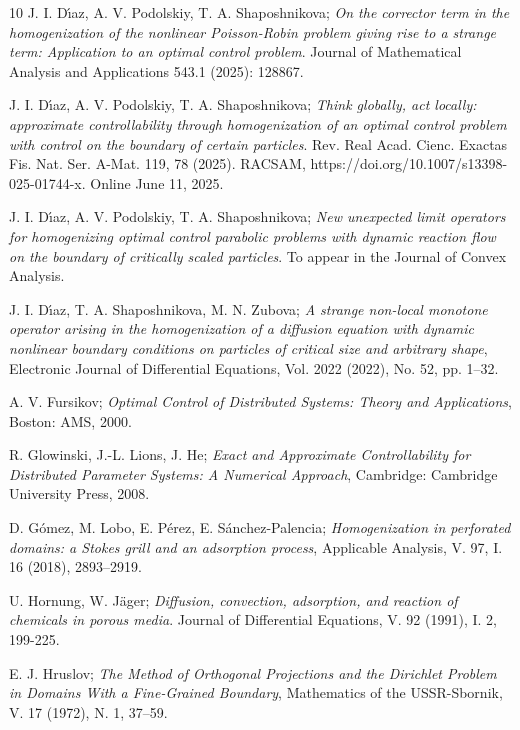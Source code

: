 \documentclass[reqno]{amsart}
\begin{document}
\begin{thebibliography}{10}
J. I. D\'{\i}az, A. V. Podolskiy, T. A. Shaposhnikova;
\emph{On the corrector term in the
homogenization of the nonlinear Poisson-Robin problem giving rise to a
strange term: Application to an optimal control problem}. 
Journal of Mathematical Analysis and Applications 543.1 (2025): 128867.

 J. I. D\'{\i}az, A. V. Podolskiy, T. A. Shaposhnikova;
\emph{Think globally, act locally: approximate controllability
through homogenization of an optimal control problem with control on the
boundary of certain particles}. Rev. Real Acad. Cienc. Exactas Fis. Nat. Ser.
A-Mat. 119, 78 (2025). RACSAM, https://doi.org/10.1007/s13398-025-01744-x.
Online June 11, 2025.

 J. I. D\'{\i}az, A. V. Podolskiy,  T. A. Shaposhnikova;
\emph{New unexpected limit operators for homogenizing optimal
control parabolic problems with dynamic reaction flow on the boundary of
critically scaled particles}. To appear in the Journal of Convex Analysis.

 J. I. D\'{\i}az, T. A. Shaposhnikova,  M. N. Zubova;
\emph{A strange non-local monotone operator arising in the homogenization
of a diffusion equation with dynamic nonlinear boundary conditions on
particles of critical size and arbitrary shape}, Electronic Journal of
Differential Equations, Vol. 2022 (2022), No. 52, pp. 1--32.

 A. V. Fursikov;
\emph{Optimal Control of Distributed Systems: Theory and Applications}, 
Boston: AMS, 2000.

 R. Glowinski, J.-L. Lions, J. He;
\emph{Exact and Approximate Controllability for Distributed Parameter Systems: 
A Numerical Approach},
Cambridge: Cambridge University Press, 2008.

 D. G\'{o}mez, M. Lobo, E. P\'{e}rez, E. S\'{a}nchez-Palencia;
\emph{Homogenization in perforated domains: a Stokes grill and an
adsorption process}, Applicable Analysis, V. 97, I. 16 (2018), 2893--2919.

 U. Hornung, W. J\"{a}ger;
\emph{Diffusion, convection, adsorption, and reaction of chemicals in porous media}. 
Journal of Differential Equations, V. 92 (1991), I. 2, 199-225.

 E. J. Hruslov;
\emph{The Method of Orthogonal Projections and the
Dirichlet Problem in Domains With a Fine-Grained Boundary},
 Mathematics of the USSR-Sbornik, V. 17 (1972), N. 1, 37--59.


\end{thebibliography}
\end{document}
